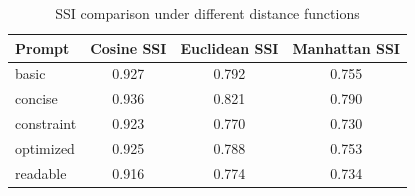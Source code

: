 \begin{table}[t]
\centering
\caption{SSI comparison under different distance functions}
\label{tab:distance_function_sensitivity}
\begin{tabular}{lccc}
\toprule
Prompt & Cosine SSI & Euclidean SSI & Manhattan SSI \\
\midrule
basic & 0.927 & 0.792 & 0.755 \\
concise & 0.936 & 0.821 & 0.790 \\
constraint & 0.923 & 0.770 & 0.730 \\
optimized & 0.925 & 0.788 & 0.753 \\
readable & 0.916 & 0.774 & 0.734 \\
\bottomrule
\end{tabular}
\end{table}
